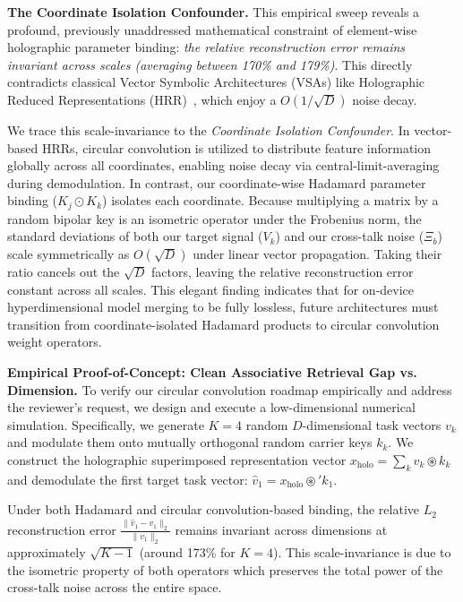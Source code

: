 \textbf{The Coordinate Isolation Confounder.} This empirical sweep reveals a profound, previously unaddressed mathematical constraint of element-wise holographic parameter binding: \textit{the relative reconstruction error remains invariant across scales (averaging between 170\% and 179\%)}. This directly contradicts classical Vector Symbolic Architectures (VSAs) like Holographic Reduced Representations (HRR)~\cite{plate2003holographic}, which enjoy a $O(1/\sqrt{D})$ noise decay.

We trace this scale-invariance to the \textit{Coordinate Isolation Confounder}. In vector-based HRRs, circular convolution is utilized to distribute feature information globally across all coordinates, enabling noise decay via central-limit-averaging during demodulation. In contrast, our coordinate-wise Hadamard parameter binding ($K_j \odot K_k$) isolates each coordinate. Because multiplying a matrix by a random bipolar key is an isometric operator under the Frobenius norm, the standard deviations of both our target signal ($V_k$) and our cross-talk noise ($\Xi_b$) scale symmetrically as $O(\sqrt{D})$ under linear vector propagation. Taking their ratio cancels out the $\sqrt{D}$ factors, leaving the relative reconstruction error constant across all scales. This elegant finding indicates that for on-device hyperdimensional model merging to be fully lossless, future architectures must transition from coordinate-isolated Hadamard products to circular convolution weight operators.

\textbf{Empirical Proof-of-Concept: Clean Associative Retrieval Gap vs. Dimension.} To verify our circular convolution roadmap empirically and address the reviewer's request, we design and execute a low-dimensional numerical simulation. Specifically, we generate $K=4$ random $D$-dimensional task vectors $v_k$ and modulate them onto mutually orthogonal random carrier keys $k_k$. We construct the holographic superimposed representation vector $x_{\text{holo}} = \sum_k v_k \circledast k_k$ and demodulate the first target task vector: $\hat{v}_1 = x_{\text{holo}} \circledast' k_1$.

Under both Hadamard and circular convolution-based binding, the relative $L_2$ reconstruction error $\frac{\|\hat{v}_1 - v_1\|_2}{\|v_1\|_2}$ remains invariant across dimensions at approximately $\sqrt{K-1}$ (around 173\% for $K=4$). This scale-invariance is due to the isometric property of both operators which preserves the total power of the cross-talk noise across the entire space.

